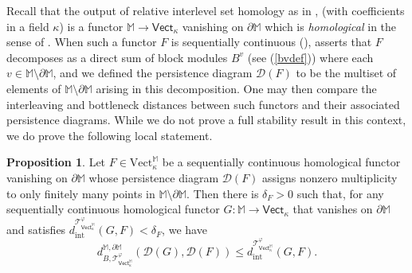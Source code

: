 \documentclass[11pt]{amsart}
\theoremstyle{definition}
\newtheorem{prop}[theorem]{Proposition}
\theoremstyle{remark}
\numberwithin{equation}{section}
\begin{document}
Recall that the output of relative interlevel set homology as in \cite{BBF20},\cite{BBF21} (with coefficients in a field $\kappa$) is a functor $\mathbb{M}\to \mathsf{Vect}_{\kappa}$ vanishing on $\partial\mathbb{M}$ which is \emph{homological} in the sense of \cite[Definition C.3]{BBF21}.  When such a functor $F$ is sequentially continuous (\cite[Definition 2.4]{BBF21}), \cite[Theorem 3.21]{BBF21} asserts that $F$ decomposes as a direct sum of block modules $B^v$ (see (\ref{bvdef})) where each $v\in\mathbb{M}\setminus\partial\mathbb{M}$, and we defined the persistence diagram $\mathcal{D}(F)$ to be the multiset of elements of $\mathbb{M}\setminus\partial\mathbb{M}$ arising in this decomposition. One may then compare the interleaving and bottleneck distances between such functors and their associated persistence diagrams.  While we do not prove a full stability result in this context, we do prove the following local statement.

\begin{prop}\label{rishstab}
	Let $F\in\mathrm{Vect}_{\kappa}^{\mathbb{M}}$ be a sequentially continuous homological functor vanishing on $\partial\mathbb{M}$ whose persistence diagram $\mathcal{D}(F)$ assigns nonzero multiplicity to only finitely many points in $\mathbb{M}\setminus\partial\mathbb{M}$.  Then  there is $\delta_F>0$ such that, for any sequentially continuous homological functor $G: \mathbb{M}\to\mathsf{Vect}_{\kappa}$ that vanishes on $\partial\mathbb{M}$ and satisfies $d_{\mathrm{int}}^{\mathcal{T}_{\mathsf{Vect}_{\kappa}^{\mathbb{M}}}^{\varphi}}(G,F)< \delta_F$, 
		we have \[ d_{B,\mathcal{T}_{\mathsf{Vect}_{\kappa}^{\mathbb{M}}}^{\varphi}}^{\mathbb{M},\partial\mathbb{M}}(\mathcal{D}(G),\mathcal{D}(F))\leq d_{\mathrm{int}}^{\mathcal{T}_{\mathsf{Vect}_{\kappa}^{\mathbb{M}}}^{\varphi}} (G,F).\]		
\end{prop}
\end{document}
